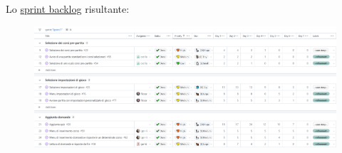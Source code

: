 
Lo \href{https://github.com/orgs/ISIQuiz/projects/3/views/18}{sprint backlog} risultante:

\begin{figure}[H]
    \centering
    \includegraphics[width=\textwidth]{process/Img/Sprint7BL.png}
    \label{fig:Sprint7BL}
\end{figure}